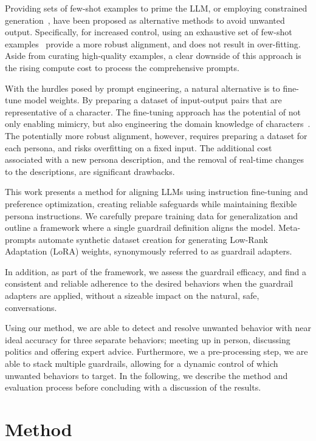 \documentclass[letterpaper]{article}
\begin{document}
Providing sets of few-shot examples to prime the LLM, or employing constrained generation~\cite{loulasyntactic, zhao2024probabilistic, lew2023sequential}, have been proposed as alternative methods to avoid unwanted output. Specifically, for increased control, using an exhaustive set of few-shot examples~\cite{agarwal2024many} provide a more robust alignment, and does not result in over-fitting. 
Aside from curating high-quality examples, a clear downside of this approach is the rising compute cost to process the comprehensive prompts.

With the hurdles posed by prompt engineering, a natural alternative is to fine-tune model weights. By preparing a dataset of input-output pairs that are representative of a character. The fine-tuning approach has the potential of not only enabling mimicry, but also engineering the domain knowledge of characters~\cite{zhang2023instruction, shao2023character}.
The potentially more robust alignment, however, requires preparing a dataset for each persona, and risks overfitting on a fixed input. The additional cost associated with a new persona description, and the removal of real-time changes to the descriptions, are significant drawbacks.

This work presents a method for aligning LLMs using instruction fine-tuning and preference optimization, creating reliable safeguards while maintaining flexible persona instructions. We carefully prepare training data for generalization and outline a framework where a single guardrail definition aligns the model. Meta-prompts automate synthetic dataset creation for generating Low-Rank Adaptation (LoRA) weights, synonymously referred to as guardrail adapters.  

In addition, as part of the framework, we assess the guardrail efficacy, and find a consistent and reliable adherence to the desired behaviors when the guardrail adapters are applied, without a sizeable impact on the natural, safe, conversations.

Using our method, we are able to detect and resolve unwanted behavior with near ideal accuracy for three separate behaviors; meeting up in person, discussing politics and offering expert advice. Furthermore, we a pre-processing step, we are able to stack multiple guardrails, allowing for a dynamic control of which unwanted behaviors to target. In the following, we describe the method and evaluation process before concluding with a discussion of the results.
\section{Method}
\end{document}
